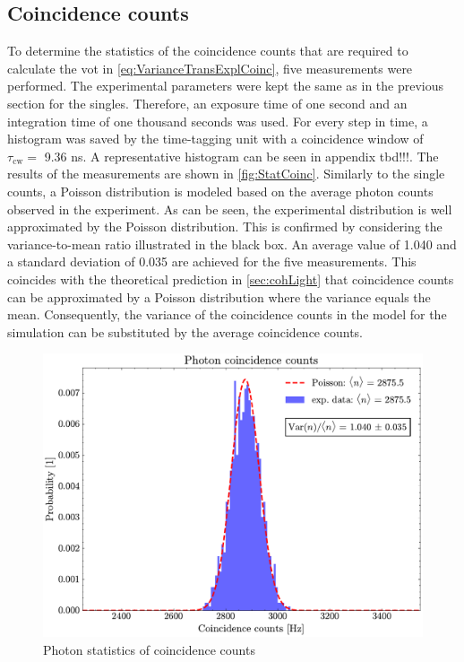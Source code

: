\subsection{Coincidence counts}
To determine the statistics of the coincidence counts that are required to calculate the \acrshort{vot} in \autoref{eq:VarianceTransExplCoinc}, five measurements were performed. The experimental parameters were kept the same as in the previous section for the singles. Therefore, an exposure time of one second and an integration time of one thousand seconds was used. For every step in time, a histogram was saved by the time-tagging unit with a coincidence window of $\tau_{\text{cw}} = $ 9.36 ns. A representative histogram can be seen in appendix tbd!!!.\newline
The results of the measurements are shown in \autoref{fig:StatCoinc}. Similarly to the single counts, a Poisson distribution is modeled based on the average photon counts observed in the experiment. As can be seen, the experimental distribution is well approximated by the Poisson distribution. This is confirmed by considering the variance-to-mean ratio illustrated in the black box. An average value of 1.040 and a standard deviation of 0.035 are achieved for the five measurements. This coincides with the theoretical prediction in \autoref{sec:cohLight} that coincidence counts can be approximated by a Poisson distribution where the variance equals the mean. \newline
Consequently, the variance of the coincidence counts in the model for the simulation can be substituted by the average coincidence counts.
\begin{figure}[tb!]
	\centering
	\includegraphics[width=.7\textwidth]{Images/CoincStatistics.pdf}
	\caption{Photon statistics of coincidence counts}
	\label{fig:StatCoinc}
\end{figure}

